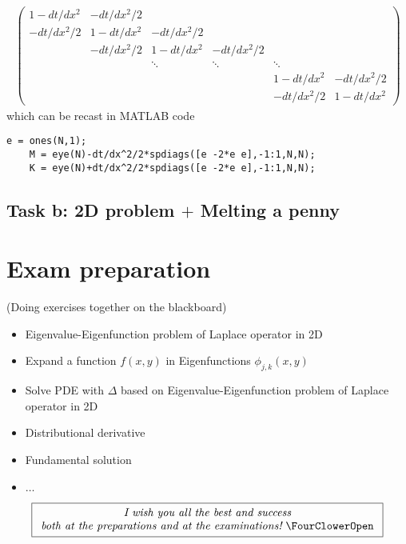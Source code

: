 \documentclass[12pt]{article}
\begin{document}
\begin{align}
	\begin{pmatrix}
		1-dt/dx^2  & -dt/dx^2/2 &            &            &            &            \\
		-dt/dx^2/2 & 1-dt/dx^2  & -dt/dx^2/2 &            &            &            \\
		           & -dt/dx^2/2 & 1-dt/dx^2  & -dt/dx^2/2 &            &            \\
		           &            & \ddots     & \ddots     & \ddots     &            \\
		           &            &            &            & 1-dt/dx^2  & -dt/dx^2/2 \\
		           &            &            &            & -dt/dx^2/2 & 1-dt/dx^2
	\end{pmatrix}
\end{align}
which can be recast in MATLAB code 
\begin{lstlisting}[caption = {Matrix M and K.}]
	e = ones(N,1);
	M = eye(N)-dt/dx^2/2*spdiags([e -2*e e],-1:1,N,N);
	K = eye(N)+dt/dx^2/2*spdiags([e -2*e e],-1:1,N,N);
\end{lstlisting}
\newpage
\subsection{Task b: 2D problem $+$ Melting a penny}
\newpage
\section{Exam preparation}
 (Doing exercises together on the blackboard)
\begin{itemize}
	\item Eigenvalue-Eigenfunction problem of Laplace operator in 2D
	\item Expand a function $f(x,y)$ in Eigenfunctions $\phi_{j,k}(x,y)$
	\item Solve PDE with $\Delta$ based on Eigenvalue-Eigenfunction problem of Laplace operator in 2D
	\item Distributional derivative
	\item Fundamental solution
	\item $\dots$
\end{itemize}
\vfill
\begin{align*}
	\boxed{
		\begin{array}{c}
			\textit{I wish you all the best and success} \\
			\textit{both at the preparations and at the examinations!}\
			$\FourClowerOpen$
		\end{array}
	}
\end{align*}
\end{document}
